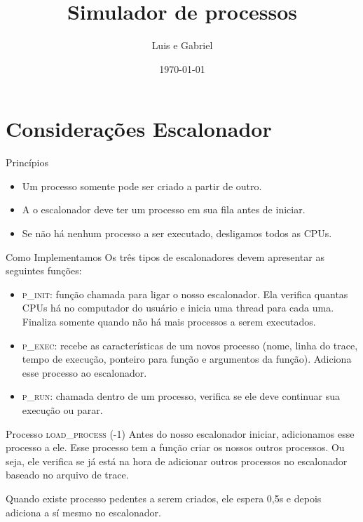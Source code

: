 \documentclass{beamer}
\title{Simulador de processos}
\date{\today}
\author{Luis e Gabriel}
\institute{Centre for Modern Beamer Themes}
\begin{document}
\maketitle

\section{Considerações Escalonador}
\begin{frame}{Princípios}
	\begin{itemize}
		\item Um processo somente pode ser criado a partir de outro.
		\item A o escalonador deve ter um processo em sua fila antes de iniciar.
		\item Se não há nenhum processo a ser executado, desligamos todos as CPUs.
	\end{itemize}
\end{frame}


\begin{frame}{Como Implementamos}
	Os três tipos de escalonadores devem apresentar as seguintes funções:
	\begin{itemize}
		\item \textsc{p\_init}: função chamada para ligar o nosso escalonador. Ela verifica quantas CPUs há no computador do usuário e inicia uma thread para cada uma. Finaliza somente quando não há mais processos a serem executados.
		\item \textsc{p\_exec}: recebe as características de um novos processo (nome, linha do trace, tempo de execução, ponteiro para função e argumentos da função). Adiciona esse processo ao escalonador.
		\item \textsc{p\_run}: chamada dentro de um processo, verifica se ele deve continuar sua execução ou parar.
	\end{itemize}
\end{frame}


\begin{frame}{Processo \textsc{load\_process} (-1)}
	\justifying
	Antes do nosso escalonador iniciar, adicionamos esse processo a ele. Esse processo tem a função criar os nossos outros processos. Ou seja, ele verifica se já está na hora de adicionar outros processos no escalonador baseado no arquivo de trace. 
	
	Quando existe processo pedentes a serem criados, ele espera 0,5s e depois adiciona a sí mesmo no escalonador. 
\end{frame}
\end{document}
